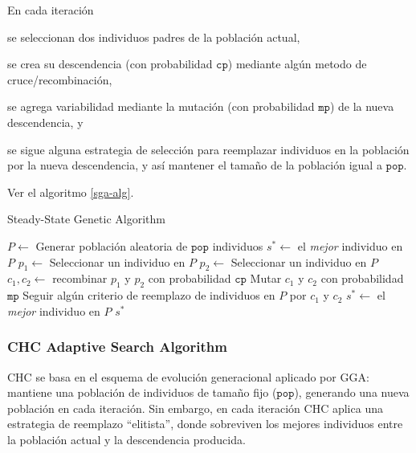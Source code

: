 En cada iteración
\begin{inparaenum}
\item se seleccionan dos individuos padres de la población actual,
\item se crea su descendencia (con probabilidad $\texttt{cp}$) mediante algún metodo de cruce/recombinación,
\item se agrega variabilidad mediante la mutación (con probabilidad $\texttt{mp}$) de la nueva descendencia, y
\item se sigue alguna estrategia de selección para reemplazar individuos en la población por la nueva descendencia, y así mantener el tamaño de la población igual a $\texttt{pop}$.
\end{inparaenum}
Ver el algoritmo \ref{sga-alg}.

\begin{algorithm}
\caption{Steady-State Genetic Algorithm}
\label{sga-alg}
\begin{algorithmic}[1]


\State $P \gets$ Generar población aleatoria de $\texttt{pop}$ individuos
\State $s^* \gets $ el \emph{mejor} individuo en $P$
	\State $p_1 \gets$ Seleccionar un individuo en $P$
	\State $p_2 \gets$ Seleccionar un individuo en $P$
	\State $c_1, c_2 \gets $ recombinar $p_1$ y $p_2$ con probabilidad $\texttt{cp}$
	\State Mutar $c_1$ y $c_2$ con probabilidad $\texttt{mp}$
	\State Seguir algún criterio de reemplazo de individuos en $P$ por $c_1$ y $c_2$
		\State $s^* \gets$ el \emph{mejor} individuo en $P$
	\EndIf
\EndWhile
\State \Return $s^*$

\end{algorithmic}
\end{algorithm}

\subsubsection{CHC Adaptive Search Algorithm}

CHC \cite{eshelman1990chc} se basa en el esquema de evolución generacional aplicado por GGA: mantiene una población de individuos de tamaño fijo ($\texttt{pop}$), generando una nueva población en cada iteración. Sin embargo, en cada iteración CHC aplica una estrategia de reemplazo ``elitista'', donde sobreviven los mejores individuos entre la población actual y la descendencia producida.

